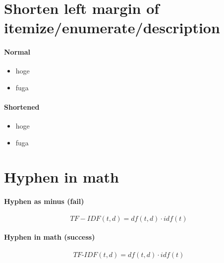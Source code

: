 \documentclass{article}
\begin{document}
\section{Shorten left margin of itemize/enumerate/description}

\paragraph{Normal}

\begin{itemize}
	\item hoge
	\item fuga
\end{itemize}

\paragraph{Shortened}

\begin{itemize}[leftmargin=*]
	\item hoge
	\item fuga
\end{itemize}


\section{Hyphen in math}

\paragraph{Hyphen as minus (fail)}

\[ TF-IDF(t, d) = df(t, d) \cdot idf(t) \]

\paragraph{Hyphen in math (success)}

\[ TF\mbox{-}IDF(t, d) = df(t, d) \cdot idf(t) \]
\end{document}

